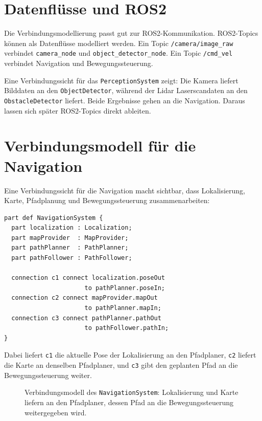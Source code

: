 \section{Datenflüsse und ROS2}
Die Verbindungsmodellierung passt gut zur ROS2-Kommunikation. ROS2-Topics können als Datenflüsse modelliert werden. Ein Topic \texttt{/camera/image\_raw} verbindet \texttt{camera\_node} und \texttt{object\_detector\_node}. Ein Topic \texttt{/cmd\_vel} verbindet Navigation und Bewegungssteuerung.

\begin{praxisbox}
Eine Verbindungssicht für das \texttt{PerceptionSystem} zeigt: Die Kamera liefert Bilddaten an den \texttt{ObjectDetector}, während der Lidar Laserscandaten an den \texttt{ObstacleDetector} liefert. Beide Ergebnisse gehen an die Navigation. Daraus lassen sich später ROS2-Topics direkt ableiten.
\end{praxisbox}

\section{Verbindungsmodell für die Navigation}
Eine Verbindungssicht für die Navigation macht sichtbar, dass Lokalisierung, Karte, Pfadplanung und Bewegungssteuerung zusammenarbeiten:

\begin{lstlisting}
part def NavigationSystem {
  part localization : Localization;
  part mapProvider  : MapProvider;
  part pathPlanner  : PathPlanner;
  part pathFollower : PathFollower;

  connection c1 connect localization.poseOut
                      to pathPlanner.poseIn;
  connection c2 connect mapProvider.mapOut
                      to pathPlanner.mapIn;
  connection c3 connect pathPlanner.pathOut
                      to pathFollower.pathIn;
}
\end{lstlisting}

Dabei liefert \texttt{c1} die aktuelle Pose der Lokalisierung an den Pfadplaner, \texttt{c2} liefert die Karte an denselben Pfadplaner, und \texttt{c3} gibt den geplanten Pfad an die Bewegungssteuerung weiter.

\begin{figure}[H]
  \centering
  \caption{Verbindungsmodell des \texttt{NavigationSystem}: Lokalisierung und Karte liefern an den Pfadplaner, dessen Pfad an die Bewegungssteuerung weitergegeben wird.}
  \label{fig:kap09-verbindungsmodell-navigation}
\end{figure}

